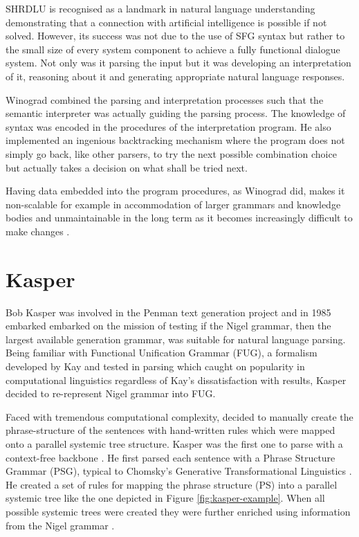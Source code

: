 SHRDLU is recognised as a landmark in natural language understanding demonstrating that a connection with artificial intelligence is possible if not solved. However, its success was not due to the use of SFG syntax but rather to the small size of every system component to achieve a fully functional dialogue system. Not only was it parsing the input but it was developing an interpretation of it, reasoning about it and generating appropriate natural language responses. 

Winograd combined the parsing and interpretation processes such that the semantic interpreter was actually guiding the parsing process. The knowledge of syntax was encoded in the procedures of the interpretation program. He also implemented an ingenious backtracking mechanism where the program does not simply go back, like other parsers, to try the next possible combination choice but actually takes a decision on what shall be tried next.  

Having data embedded into the program procedures, as Winograd did, makes it non-scalable for example in accommodation of larger grammars and knowledge bodies and unmaintainable in the long term as it becomes increasingly difficult to make changes \citep{Weerasinghe1994}.

\section{Kasper}
Bob Kasper was involved in the Penman text generation project and in 1985 embarked embarked on the mission of testing if the Nigel grammar, then the largest available generation grammar, was suitable for natural language parsing. Being familiar with Functional Unification Grammar (FUG), a formalism developed by Kay and tested in parsing \citep{Kay1985} which caught on popularity in computational linguistics regardless of Kay's dissatisfaction with results, Kasper decided to re-represent Nigel grammar into FUG. 

Faced with tremendous computational complexity, \citet{Kasper1988} decided to manually create the phrase-structure of the sentences with hand-written rules which were mapped onto a parallel systemic tree structure. Kasper was the first one to parse with a context-free backbone \citep{Kasper1988}. He first parsed each sentence with a Phrase Structure Grammar (PSG), typical to Chomsky's Generative Transformational Linguistics \citep{Chomsky57}. He created a set of rules for mapping the phrase structure (PS) into a parallel systemic tree like the one depicted in Figure \ref{fig:kasper-example}. When all possible systemic trees were created they were further enriched using information from the Nigel grammar \citep{Matthiessen1985}.

